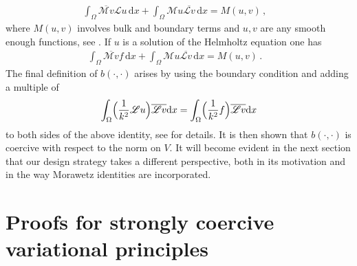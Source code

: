\documentclass[twoside,11pt]{article}
\def\d{{\mathrm d}}
\def\L{{\mathscr{L}}}
\def\L{{\mathscr{L}}}
\begin{document}
{\begin{remark}
\begin{align}
\int_\Omega \overline{ \mathcal{M} v } \L u\, \d x
+
\int_\Omega  \mathcal{M}u  \overline{\L v}\, \d x = M (u, v)\, ,
&
\end{align}
where $M(u, v)$ involves bulk and boundary terms and $u, v$ are any smooth enough functions, see \cite[Lemma 2.4]{Moiola_Spence2014}.
If $u$ is a solution of the Helmholtz equation one has
\begin{align}\label{morawetz_MS_2}
\int_\Omega \overline{ \mathcal{M} v } f\, \d x
+
\int_\Omega  \mathcal{M}u  \overline{\L v}\, \d x = M (u, v)\, .
&
\end{align}
The final definition of $b(\cdot, \cdot)$ arises by using the boundary condition and adding a multiple of 
$$ \int_{\Omega} \Bigl( \frac{1}{ k^2} \L u \Bigr)  \overline{\L v}  \d x  = \int_{\Omega} \Bigl( \frac{1}{ k^2} f \Bigr)  \overline{\L v}  \d x $$ to both sides of the above identity, see \cite[Proof of Proposition 3.2]{Moiola_Spence2014} for details. It is then shown that 
 $b(\cdot, \cdot)$ is coercive with respect to the norm on $V.$ It will become evident in the next section that our design strategy takes a different perspective, both in its motivation and in the way Morawetz identities are incorporated.  
\end{remark}



\section{Proofs for strongly coercive variational principles}
\label{sec:proofs}


}
\end{document}
